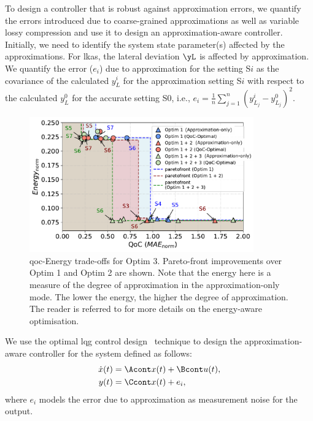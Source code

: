 \par To design a controller that is robust against approximation errors, we quantify the errors introduced due to coarse-grained approximations as well as variable lossy compression and use it to design an approximation-aware controller.
Initially, we need to identify the system state parameter(s) affected by the approximations. 
For \gls{lkas}, the lateral deviation $\yL$ is affected by approximation. 
We quantify the error ($e_i$) due to approximation for the setting S$i$ as the covariance of the calculated $y_L^{i}$ for the approximation setting S$i$ with respect to the calculated $y_L^{0}$ for the accurate setting S0, i.e.,  
\begin{math}
e_i=\frac{1}{n}\sum_{j=1}^{n}(y_{L_j}^{i}-y_{L_j}^{0})^2
\end{math}.

\begin{figure}[ht]
    \centering
    \includegraphics[width= 0.86\textwidth]{figs/lqg1_2.pdf}
    \caption{{\Gls{qoc}-Energy trade-offs for Optim 3. Pareto-front improvements over Optim 1 and Optim 2 are shown. Note that the energy here is a measure of the degree of approximation in the approximation-only mode. The lower the energy, the higher the degree of approximation. The reader is referred to \cite{de2020access} for more details on the energy-aware optimisation.}}
    \label{fig:optim3}
\end{figure}
We use the optimal \gls{lqg} control design~\cite{franklin1998digital} technique to design the approximation-aware controller for the system defined as follows:
\begin{align}
     \dot x(t) &= \Acont x(t) + \Bcont u(t), \nonumber \\
     y(t) &= \Ccont x(t) + e_i,
     \nonumber
\end{align}
where $e_i$ models the error due to approximation as measurement noise for the output.

